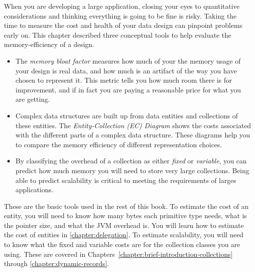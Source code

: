 When you are developing a large application, closing your eyes to quantitative
considerations and thinking everything is going to be fine is risky. Taking the
time to measure the cost and health of your data design can pinpoint problems
early on. This chapter described three conceptual tools to help evaluate the
memory-efficiency of a design.
\begin{itemize}
\item The \textsl{memory bloat factor} measures how much of your the memory
usage of your design is real data, and how much is an artifact of the way you
have chosen to represent it. This metric tells you how much room there is for
improvement, and if in fact you are paying a reasonable price for what you are
getting.
\item Complex data structures are built up from data entities and collections of
these entities.  The \textsl{Entity-Collection (EC) Diagram} shows the costs
associated with the different parts of a complex data structure. These diagrams
help you to compare the memory efficiency of different representation choices.
\item By classifying the overhead of a collection as either \textsl{fixed} or
\textsl{variable}, you can predict how much memory you will need to store very
large collections. Being able to predict scalability is critical to meeting the
requirements of larges applications.
\end{itemize}
These are the basic tools used in the rest of this book. To estimate the cost of
an entity, you will need to know how many bytes each primitive type needs, what
is the pointer size, and what the JVM overhead is. You will learn how to
estimate the cost of entities in \autoref{chapter:delegation}. To estimate scalability,
you will need to know what the fixed and variable costs are for the collection classes
you are using. These are covered in Chapters~\ref{chapter:brief-introduction-collections}
through \ref{chapter:dynamic-records}.

